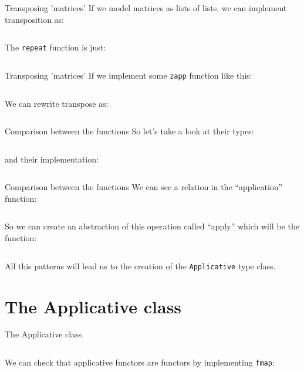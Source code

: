 \documentclass[10pt]{beamer}
\begin{document}
\begin{frame}{Transposing 'matrices'}
  If we model matrices as lists of lists, we can implement
  transposition as:

  \inputminted{haskell}{../src/transpose.hs}

  The \verb~repeat~ function is just:

  \inputminted{haskell}{../src/repeat.hs}
\end{frame}

\begin{frame}{Transposing 'matrices'}
  If we implement some \verb~zapp~ function like this:

  \inputminted{haskell}{../src/zapp.hs}

  We can rewrite transpose as:

  \inputminted{haskell}{../src/transpose1.hs}
\end{frame}

\begin{frame}{Comparison between the functions}
  So let's take a look at their types:

  \inputminted{haskell}{../src/comparison_types.hs}

  and their implementation:

  \inputminted{haskell}{../src/comparison_impl.hs}
\end{frame}

\begin{frame}{Comparison between the functions}
  We can see a relation in the ``application'' function:

  \inputminted{haskell}{../src/comparison_types_ap.hs}

  So we can create an abstraction of this operation called ``apply''
  which will be the function:

  \inputminted{haskell}{../src/apply_type.hs}

  All this patterns will lead us to the creation of the
  \verb~Applicative~ type class.
\end{frame}

\section{The Applicative class}

\begin{frame}{The Applicative class}

  \inputminted{haskell}{../src/applicative.hs}

  We can check that applicative functors are functors by implementing
  \verb~fmap~:

  \inputminted{haskell}{../src/fmap.hs}
\end{frame}
\end{document}
